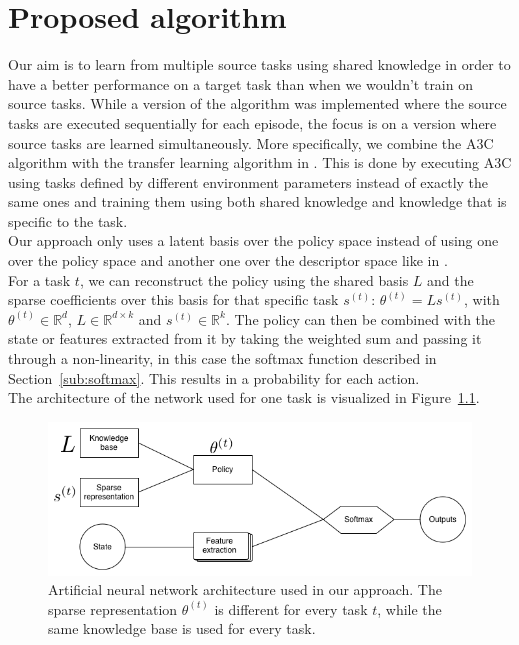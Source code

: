 \chapter{Proposed algorithm}
\label{cha:proposed_algorithm} %
Our aim is to learn from multiple source tasks using shared knowledge in order to have a better performance on a target task than when we wouldn't train on source tasks.
While a version of the algorithm was implemented where the source tasks are executed sequentially for each episode, the focus is on a version where source tasks are learned simultaneously.
More specifically, we combine the A3C algorithm \parencite{Mnih2016AsynchronousLearning} with the transfer learning algorithm in \cite{Isele2016UsingLearning}.
This is done by executing A3C using tasks defined by different environment parameters instead of exactly the same ones and training them using both shared knowledge and knowledge that is specific to the task.\\

Our approach only uses a latent basis over the policy space instead of using one over the policy space and another one over the descriptor space like in \cite{Isele2016UsingLearning}.\\
For a task $t$, we can reconstruct the policy using the shared basis $L$ and the sparse coefficients over this basis for that specific task $s^{(t)}$: $\theta^{(t)} = Ls^{(t)}$, with $\theta^{(t)} \in \mathbb{R}^d$, $L \in \mathbb{R}^{d \times k}$ and $s^{(t)} \in \mathbb{R}^k$. The policy can then be combined with the state or features extracted from it by taking the weighted sum and passing it through a non-linearity, in this case the softmax function described in Section~\ref{sub:softmax}.
This results in a probability for each action.\\
The architecture of the network used for one task is visualized in Figure~\ref{fig:algonn}.
\begin{figure}[htb]
    \centering
    \includegraphics[width=.9\linewidth]{images/knowledge_transfer.png}
    \caption[Artificial neural network architecture used in our approach]{Artificial neural network architecture used in our approach. The sparse representation $\theta^{(t)}$ is different for every task $t$, while the same knowledge base is used for every task.}
    \label{fig:algonn}
\end{figure}\\

